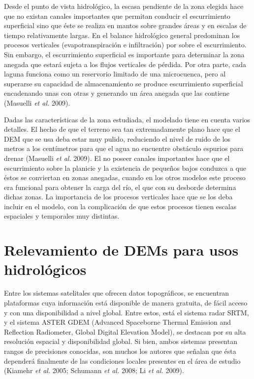 \documentclass[10pt,a4paper, twoside]{report}
\begin{document}
Desde el punto de vista hidrológico, la escasa pendiente de la zona elegida hace que no existan canales importantes que permitan conducir el escurrimiento superficial sino que éste se realiza en mantos sobre grandes áreas y en escalas de tiempo relativamente largas. En el balance hidrológico general predominan los procesos verticales (evapotranspiración e infiltración) por sobre el escurrimiento. Sin embargo, el escurrimiento superficial es importante para determinar la zona anegada que estará sujeta a los flujos verticales de pérdida. Por otra parte, cada laguna funciona como un reservorio limitado de una microcuenca, pero al superarse su capacidad de almacenamiento se produce escurrimiento superficial encadenando unas con otras y generando un área anegada que las contiene (Masuelli \textit{et al.} 2009).

Dadas las características de la zona estudiada, el modelado tiene en cuenta varios detalles. El hecho de que el terreno sea tan extremadamente plano hace que el DEM que se usa deba estar muy pulido, reduciendo el nivel de ruido de los metros a los centímetros para que el agua no encuentre obstáculo espurios para drenar (Masuelli \textit{et al.} 2009). El no poseer canales importantes hace que el escurrimiento sobre la planicie y la existencia de pequeños bajos conduzca a que éstos se conviertan en zonas anegadas, cuando en los otros modelos este proceso era funcional para obtener la carga del río, el que con su desborde determina dichas zonas. La importancia de los procesos verticales hace que se los deba incluir en el modelo, con la complicación de que estos procesos tienen escalas espaciales y temporales muy distintas.






\section{Relevamiento de DEMs para usos hidrológicos}


Entre los sistemas satelitales que ofrecen datos topográficos, se encuentran plataformas cuya información está disponible de manera gratuita, de fácil acceso y con una disponibilidad a nivel global. Entre estos, está el sistema radar SRTM, y el sistema ASTER GDEM (Advanced Spaceborne Thermal Emission and Reflection Radiometer, Global Digital Elevation Model), se destacan por su alta resolución espacial y disponibilidad global. Si bien, ambos sistemas presentan rangos de precisiones conocidas, son muchos los autores que señalan que ésta dependerá finalmente de las condiciones locales presentes en el área de estudio (Kiamehr \textit{et al.} 2005; Schumann \textit{et al.} 2008; Li \textit{et al.} 2009).
\end{document}
